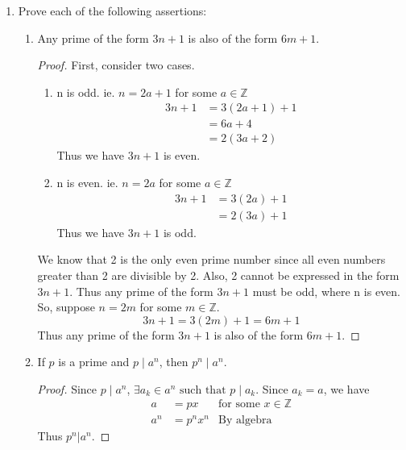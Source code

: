 \documentclass[11pt]{article}
\newcommand{\ZZ}{\mathbb{Z}}
\begin{document}
\begin{enumerate}
    \item Prove each of the following assertions:
        \begin{enumerate}
        \item Any prime of the form $3n+1$ is also of the form $6m+1$.
        \begin{proof}
            First, consider two cases.
            \begin{enumerate}
                \item n is odd. ie. $n=2a+1$ for some $a\in\ZZ$ \\
                \begin{align*}
                    3n+1 &= 3(2a+1) + 1 \\
                    &= 6a+4 \\
                    &=2(3a+2)
                \end{align*}
                Thus we have $3n+1$ is even.                
                \item n is even. ie. $n=2a$ for some $a\in\ZZ$
                \begin{align*}
                    3n+1 &= 3(2a)+1 \\
                    &= 2(3a)+1
                \end{align*}
                Thus we have $3n+1$ is odd.
            \end{enumerate}
            We know that 2 is the only even prime number since all even numbers 
            greater than 2 are divisible by 2. Also, 2 cannot be expressed in the 
            form $3n+1$. Thus any prime of the form $3n+1$ must be odd, where
            n is even. So, suppose $n=2m$ for some $m\in\ZZ$.
            \[ 3n+1 = 3(2m)+1 = 6m+1 \]
            Thus any prime of the form $3n+1$ is also of the form $6m+1$.
        \end{proof}

        \item If $p$ is a prime and $p\mid a^n$, then $p^n\mid a^n$.
        \begin{proof}
            Since $p\mid a^n$, $\exists a_k\in a^n \text{ such that }p\mid a_k$.
            Since $a_k=a$, we have
            \begin{align*}
                a &= px &\text{for some }x\in\ZZ \\
                a^n &= p^nx^n &\text{By algebra}
            \end{align*}
            Thus $p^n|a^n$.
        \end{proof}


\end{enumerate}
\end{enumerate}
\end{document}
